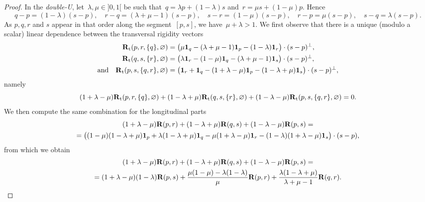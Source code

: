 \documentclass{amsart}
\theoremstyle{definition}
\renewcommand{\b}[1]{{\boldsymbol{#1}}} %
\newcommand{\one}{\mathbf{1}} %
\newcommand{\Rvector}{\b{\rm R}} %
\newcommand{\trans}{\operatorname{t}} %
\newcommand{\Rtrans}{\Rvector_{\trans}} %
\begin{document}
\begin{proof}
\medskip
In the \emph{double-U}, let~$\lambda,\mu \in {]0,1[}$ be such that~$q = \lambda p + (1-\lambda) s$ and~$r = \mu s + (1-\mu) p$.
Hence
\[
q-p = (1-\lambda)(s-p), \quad
r-q = (\lambda+\mu-1)(s-p), \quad
s-r = (1-\mu)(s-p), \quad
r-p = \mu(s-p), \quad
s-q = \lambda(s-p).
\]
As $p,q,r$ and $s$ appear in that order along the segment~$[p,s]$, we have~$\mu+\lambda >1$. 
We first observe that there is a unique (modulo a scalar) linear dependence between the transversal rigidity vectors
\begin{align*}
\Rtrans(p, r, \{q\}, \varnothing) & = \bigl( \mu \one_q - (\lambda+\mu-1) \one_p - (1-\lambda) \one_r \bigr) \cdot (s-p)^\perp, \\
\Rtrans(q, s, \{r\}, \varnothing) & = \bigl( \lambda \one_r - (1-\mu) \one_q - (\lambda+\mu-1) \one_s \bigr) \cdot (s-p)^\perp, \\
\text{and} \quad \Rtrans(p, s, \{q,r\}, \varnothing) & = \bigl( \one_r + \one_q - (1+\lambda-\mu) \one_p - (1-\lambda+\mu) \one_s  \bigr) \cdot (s-p)^\perp,
\end{align*}
namely
\[
(1+\lambda-\mu) \Rtrans(p, r, \{q\}, \varnothing) + (1-\lambda+\mu) \Rtrans(q, s, \{r\}, \varnothing) + (1-\lambda-\mu) \Rtrans(p, s, \{q,r\}, \varnothing) = 0.
\]
We then compute the same combination for the longitudinal parts
\begin{multline*}
(1+\lambda-\mu) \Rvector(p, r) + (1-\lambda+\mu) \Rvector(q, s) + (1-\lambda-\mu) \Rvector(p, s) = \\
= \bigl( (1-\mu)(1-\lambda+\mu) \one_p + \lambda (1-\lambda+\mu) \one_q - \mu (1+\lambda-\mu) \one_r - (1-\lambda)(1+\lambda-\mu) \one_s \bigr) \cdot (s-p),
\end{multline*}
from which we obtain
\begin{multline*}
(1+\lambda-\mu) \Rvector(p, r) + (1-\lambda+\mu) \Rvector(q, s) + (1-\lambda-\mu) \Rvector(p, s) = \\
= (1+\lambda-\mu)(1-\lambda)\Rvector(p, s) + \frac{\mu(1-\mu)-\lambda(1-\lambda)}{\mu}\Rvector(p, r) + \frac{\lambda(1-\lambda+\mu)}{\lambda+\mu-1} \Rvector(q, r).
\end{multline*}


\end{proof}
\end{document}
